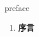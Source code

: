 
\begin{frame}
{\huge preface}
\begin{center}
\begin{enumerate}\Large
  \item \textbf{序言}
\end{enumerate}
\end{center}
\end{frame}
